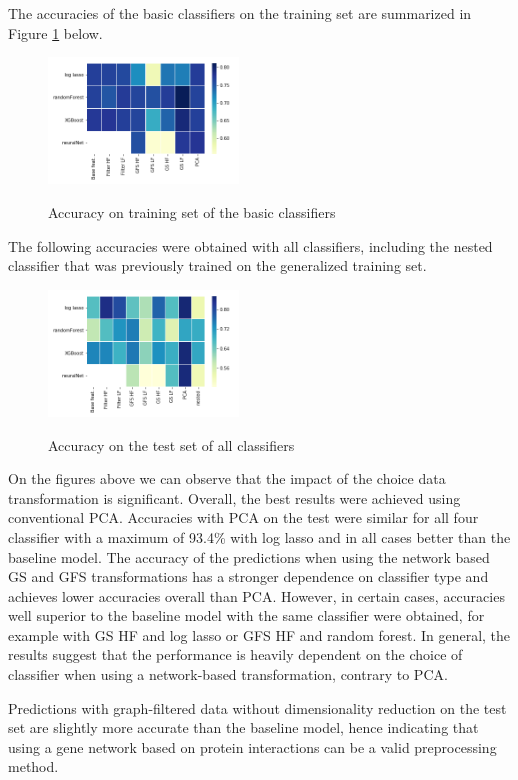 \documentclass[10pt,conference,compsocconf]{IEEEtran}
\begin{document}
The accuracies of the basic classifiers on the training set are summarized in Figure \ref{fig:train_acc} below.
\begin{figure}
	\centering
	\includegraphics[width=0.45\textwidth]{train_accuracy.png}
	\label{fig:train_acc}
	\caption{Accuracy on training set of the basic classifiers}
\end{figure}
The following accuracies were obtained with all classifiers, including the nested classifier that was previously trained on the generalized training set.
\begin{figure}
	\centering
	\includegraphics[width=0.45\textwidth]{test_accuracy.png}
	\label{fig:test_acc}
	\caption{Accuracy on the test set of all classifiers }
\end{figure}
On the figures above we can observe that the impact of the choice data transformation is significant. Overall, the best results were achieved using conventional PCA. Accuracies with PCA on the test were similar for all four classifier with a maximum of 93.4\% with log lasso and in all cases better than the baseline model.
The accuracy of the predictions when using the network based GS and GFS transformations has a stronger dependence on classifier type and achieves lower accuracies overall than PCA. However, in certain cases, accuracies well superior to the baseline model with the same classifier were obtained, for example with GS HF and log lasso or GFS HF and random forest. In general, the results suggest that the performance is heavily dependent on the choice of classifier when using a network-based transformation, contrary to PCA.   

\par  
Predictions with graph-filtered data without dimensionality reduction on the test set are slightly more accurate than the baseline model, hence indicating that using a gene network based on protein interactions can be a valid preprocessing method.
\end{document}
